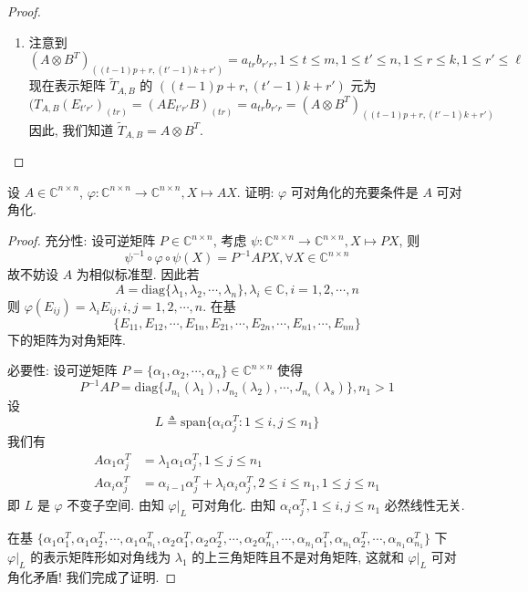 \documentclass[../../main.tex]{subfiles}%
\begin{document}
\begin{proof}
\begin{enumerate}
\item 注意到
$$(A \otimes B^T)_{((t - 1)p + r, (t' - 1)k + r')} = a_{tr} b_{r'r}, 1 \leqslant  t \leqslant  m, 1 \leqslant  t' \leqslant  n, 1 \leqslant  r \leqslant  k, 1 \leqslant  r' \leqslant  \ell$$
现在表示矩阵 $\widetilde{T}_{A,B}$ 的 $((t - 1)p + r, (t' - 1)k + r')$ 元为
$$(T_{A,B}(E_{t'r'})_{(tr)} = (AE_{t'r'}B)_{(tr)} = a_{tr} b_{r'r} = (A \otimes B^T)_{((t - 1)p + r, (t' - 1)k + r')}$$
因此, 我们知道 $\widetilde{T}_{A,B} = A \otimes B^T$.
\end{enumerate}

\end{proof}

\begin{example}
设 $A \in \mathbb{C}^{n \times n}$, $\varphi : \mathbb{C}^{n \times n} \to \mathbb{C}^{n \times n}, X \mapsto AX$. 证明: $\varphi$ 可对角化的充要条件是 $A$ 可对角化.
\end{example}
\begin{proof}

{\heiti 充分性:}
设可逆矩阵 $P \in \mathbb{C}^{n \times n}$, 考虑 $\psi : \mathbb{C}^{n \times n} \to \mathbb{C}^{n \times n}, X \mapsto PX$, 则
$$\psi^{-1} \circ \varphi \circ \psi (X) = P^{-1}APX, \forall X \in \mathbb{C}^{n \times n}$$
故不妨设 $A$ 为相似标准型. 因此若
$$A = \mathrm{diag}\{\lambda_1, \lambda_2, \cdots, \lambda_n\}, \lambda_i \in \mathbb{C}, i = 1, 2, \cdots, n$$
则 $\varphi(E_{ij}) = \lambda_i E_{ij}, i, j = 1, 2, \cdots, n$. 在基
$$\{E_{11}, E_{12}, \cdots, E_{1n}, E_{21}, \cdots, E_{2n}, \cdots, E_{n1}, \cdots, E_{nn}\}$$
下的矩阵为对角矩阵.

{\heiti 必要性:}
设可逆矩阵 $P = \{\alpha_1, \alpha_2, \cdots, \alpha_n\} \in \mathbb{C}^{n \times n}$ 使得
$$P^{-1}AP = \mathrm{diag}\{J_{n_1}(\lambda_1), J_{n_2}(\lambda_2), \cdots, J_{n_s}(\lambda_s)\}, n_1 > 1$$
设
$$L \triangleq \mathrm{span}\{\alpha_i \alpha_j^T : 1 \leqslant  i, j \leqslant  n_1\}$$
我们有
\begin{align*}
A\alpha_1 \alpha_j^T &= \lambda_1 \alpha_1 \alpha_j^T, 1 \leqslant  j \leqslant  n_1 \\
A\alpha_i \alpha_j^T &= \alpha_{i - 1} \alpha_j^T + \lambda_i \alpha_i \alpha_j^T, 2 \leqslant  i \leqslant  n_1, 1 \leqslant  j \leqslant  n_1
\end{align*}
即 $L$ 是 $\varphi$ 不变子空间. 由知 $\varphi|_L$ 可对角化. 由知 $\alpha_i \alpha_j^T, 1 \leqslant  i, j \leqslant  n_1$ 必然线性无关.

在基 $\{\alpha_1 \alpha_1^T, \alpha_1 \alpha_2^T, \cdots, \alpha_1 \alpha_{n_1}^T, \alpha_2 \alpha_1^T, \alpha_2 \alpha_2^T, \cdots, \alpha_2 \alpha_{n_1}^T, \cdots, \alpha_{n_1} \alpha_1^T, \alpha_{n_1} \alpha_2^T, \cdots, \alpha_{n_1} \alpha_{n_1}^T\}$ 下 $\varphi|_L$ 的表示矩阵形如对角线为 $\lambda_1$ 的上三角矩阵且不是对角矩阵, 这就和 $\varphi|_L$ 可对角化矛盾! 我们完成了证明.

\end{proof}
\end{document}
